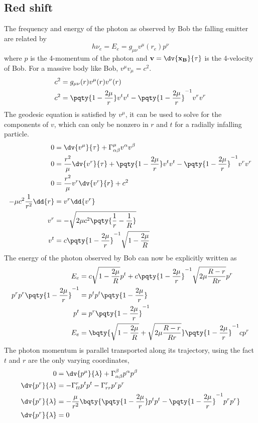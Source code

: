 \documentclass[12pt]{article}
\begin{document}
        \subsection{Red shift}
        The frequency and energy of the photon as observed by Bob the falling emitter are related by \[
            h \nu_e =E_e = g_{\mu\nu} v^\mu(r_e) p^\nu 
        \]
        where \(p\) is the 4-momentum of the photon and \(\bf v = \dv{\bf x_B}{\tau}\) is the 4-velocity of Bob. For a massive body like Bob, \(v^\mu v_\mu = c^2\). \begin{align*}
            c^2 &= g_{\mu\nu}(r) v^\mu(r) v^\nu(r)\\
            c^2 &= \pqty{1 - \frac{2\mu}{r} } v^t v^t - \pqty{1 - \frac{2\mu}{r}}^{-1} v^rv^r 
        \end{align*}
        The geodesic equation is satisfied by \(v^\mu\), it can be used to solve for the components of \(v\), which can only be nonzero in \(r\) and \(t\) for a radially infalling particle.
        \begin{align*}
            0 &= \dv{v^\mu}{\tau} + \Gamma^{\mu}_{\alpha\beta} v^\alpha v^\beta\\
            0 &= \frac{r^2}{\mu}\dv{v^r}{\tau} + \pqty{1 - \frac{2\mu}{r}} v^t v^t - \pqty{1 - \frac{2\mu}{r}}^{-1} v^r v^r \\
            0 &= \frac{r^2}{\mu}v^r\dv{v^r}{r} + c^2\\
            - \mu c^2 \frac{1}{r^2}\dd{r}&= v^r \dd{v^r}\\
            v^r &= -\sqrt{2\mu c^2 \pqty{\frac{1}{r} - \frac{1}{R}}} \\
            v^t &= c\pqty{1 - \frac{2\mu}{r}}^{-1} \sqrt{1 - \frac{2\mu}{R}} 
        \end{align*}
        The energy of the photon observed by Bob can now be explicitly written as 
        \begin{align*}
            E_e &= c \sqrt{1 - \frac{2\mu}{R}} p^t + c\pqty{1 - \frac{2\mu}{r}}^{-1} \sqrt{2\mu \frac{R - r}{Rr} } p^r\\
            p^r p^r \pqty{1 - \frac{2\mu}{r}}^{-1} &=  p^t p^t \pqty{1 - \frac{2\mu}{r}}\\
            p^t &=  p^r \pqty{1 - \frac{2\mu}{r}}^{-1}\\
            E_e &= \bqty{\sqrt{1 - \frac{2\mu}{R}}  + \sqrt{2\mu \frac{R - r}{Rr} }}  \pqty{1 - \frac{2\mu}{r}}^{-1} cp^r
        \end{align*} The photon momentum is parallel transported along its trajectory, using the fact \(t\) and \(r\) are the only varying coordinates, \begin{align*}
            0 &= \dv{p^\mu}{\lambda} + \Gamma^{\beta}_{\alpha\beta} p^\alpha p^\beta \\
            \dv{p^r}{\lambda} &= -\Gamma^{r}_{tt} p^t p^t -\Gamma^{r}_{rr} p^r p^r\\
            \dv{p^r}{\lambda} &= - \frac{\mu}{r^2} \bqty{ \pqty{1 - \frac{2\mu}{r}}p^t p^t - \pqty{1 - \frac{2\mu}{r}}^{-1}p^r p^r}\\
            \dv{p^r}{\lambda} &= 0
        \end{align*}
\end{document}
